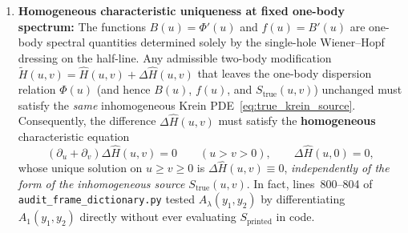 \documentclass[11pt,a4paper]{article}
\begin{document}
\begin{enumerate}[leftmargin=2em]
  \item \textbf{Homogeneous characteristic uniqueness at fixed one-body spectrum:}
  The functions $B(u)=\Phi'(u)$ and $f(u)=B'(u)$ are one-body spectral quantities determined solely by the single-hole Wiener--Hopf dressing on the half-line. Any admissible two-body modification $\widetilde{H}(u,v)=\widehat{H}(u,v)+\Delta\widehat{H}(u,v)$ that leaves the one-body dispersion relation $\Phi(u)$ (and hence $B(u)$, $f(u)$, and $S_{\mathrm{true}}(u,v)$) unchanged must satisfy the \emph{same} inhomogeneous Krein PDE~\eqref{eq:true_krein_source}. Consequently, the difference $\Delta\widehat{H}(u,v)$ must satisfy the \textbf{homogeneous} characteristic equation
  \begin{equation}
    (\partial_u+\partial_v)\Delta\widehat{H}(u,v) = 0 \qquad (u>v>0), \qquad \Delta\widehat{H}(u,0)=0,
  \end{equation}
  whose unique solution on $u\ge v\ge 0$ is $\Delta\widehat{H}(u,v)\equiv 0$, \emph{independently of the form of the inhomogeneous source $S_{\mathrm{true}}(u,v)$}. In fact, lines~800--804 of \texttt{audit\_frame\_dictionary.py} tested $A_\lambda(y_1,y_2)$ by differentiating $A_1(y_1,y_2)$ directly without ever evaluating $S_{\mathrm{printed}}$ in code.


\end{enumerate}
\end{document}

